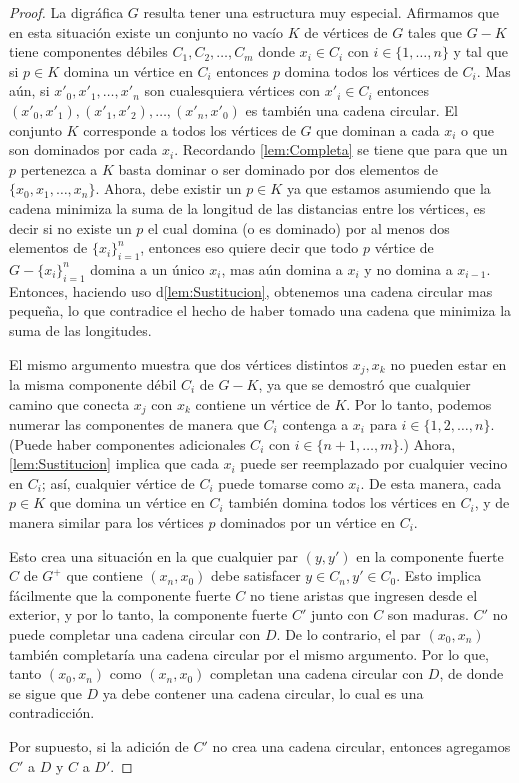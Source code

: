 \begin{proof}
La digráfica $G$ resulta tener una estructura muy especial. Afirmamos que en
esta situación existe un conjunto no vac\'io $K$ de vértices de $G$ tales que
$G-K$ tiene componentes d\'ebiles $C_1,C_2,\dots,C_m$ donde $x_i\in C_i$ con
$i \in \{ 1, \dots, n \}$ y tal que si $p\in K$ domina un vértice en $C_i$
entonces $p$ domina todos los vértices de $C_i$. Mas aún, si $x'_0,x'_1,\dots,
x'_n$ son cualesquiera vértices con $x'_i\in C_i$ entonces
$(x'_0,x'_1),(x'_1,x'_2),\dots,(x'_n,x'_0)$ es también una cadena circular. El
conjunto $K$ corresponde a todos los vértices de $G$ que dominan a cada $x_i$ o
que son dominados por cada $x_i$. Recordando \cref{lem:Completa} se tiene que
para que un $p$ pertenezca a $K$ basta dominar o ser dominado por dos elementos
de $\{x_0,x_1,\dots,x_n \}$. Ahora, debe existir un $p\in K$ ya que estamos
asumiendo que la cadena minimiza la suma de la longitud de las distancias entre
los v\'ertices, es decir si no existe un $p$ el cual domina (o es dominado) por
al menos dos elementos de $\{x_i \}_{i=1} ^n$, entonces eso quiere decir que
todo $p$ v\'ertice de $G-\{x_i\}_{i=1} ^n$ domina a un único $x_i$, mas aún
domina a $x_i$ y no domina a $x_{i-1}$. Entonces, haciendo uso
d\cref{lem:Sustitucion}, obtenemos una cadena circular mas pequeña, lo que
contradice el hecho de haber tomado una cadena que minimiza la suma de las
longitudes.

El mismo argumento muestra que dos v\'ertices distintos $x_j, x_k$ no pueden
estar en la misma componente débil $C_i$ de $G - K$, ya que se demostró que
cualquier camino que conecta $x_j$ con $x_k$ contiene un vértice de $K$. Por lo
tanto, podemos numerar las componentes de manera que $C_i$ contenga a $x_i$ para
$i \in \{ 1, 2, \dots, n \}$. (Puede haber componentes adicionales $C_i $ con $i
\in \{ n + 1, \dots , m \}$.) Ahora, \cref{lem:Sustitucion} implica que cada
$x_i$ puede ser
reemplazado por cualquier vecino en $C_i$; así, cualquier vértice de $C_i$ puede
tomarse como $x_i$. De esta manera, cada $p \in K$ que domina un vértice en
$C_i$ también domina todos los vértices en $C_i$, y de manera similar para los
vértices $p$ dominados por un vértice en $C_i$.

Esto crea una situación en la que cualquier par $(y, y')$ en la componente
fuerte $C$ de $G^+$ que contiene $(x_n, x_0)$ debe satisfacer $y \in  C_n, y'
\in C_0$. Esto implica fácilmente que la componente fuerte $C$ no tiene aristas
que ingresen desde el exterior, y por lo tanto, la componente fuerte $C'$ junto
con $C$ son maduras. $C'$ no puede completar una cadena circular con $D$. De lo
contrario, el par $(x_0, x_n)$ también completaría una cadena circular por el
mismo argumento. Por lo que, tanto $(x_0, x_n)$ como $(x_n, x_0)$ completan
una cadena circular con $D$, de donde se sigue que $D$ ya debe contener una
cadena circular, lo cual es una contradicción.

Por supuesto, si la adición de $C'$ no crea una cadena circular, entonces
agregamos $C '$ a $D$ y $C$ a $D'$.
\end{proof}

